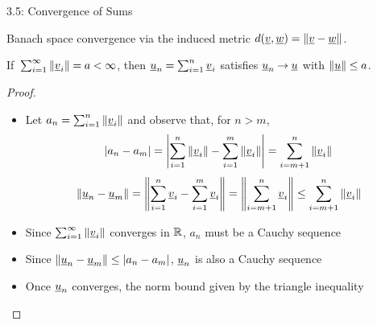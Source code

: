 \documentclass[10pt,english,aspectratio=169]{beamer}
\begin{document}
\begin{frame}{3.5: Convergence of Sums}


Banach space convergence via the induced metric $d(\underline{v}, \underline{w}) = \| \underline{v}-\underline{w} \|$.

\newcommand{\vtp}{\hspace{-0.02em}}
\begin{lemma}
If $\,\sum_{i=1}^\infty \| \vecnot{v}_i \| \vtp = \vtp a \vtp <\vtp \infty$, then $\vecnot{u}_n \vtp = \vtp \sum_{i=1}^n \vecnot{v}_i$ satisfies $\vecnot{u}_n \vtp \to \vtp \vecnot{u}$ with $\| \vecnot{u} \| \vtp \leq \vtp a$.
\end{lemma}
\vspace{-0.5mm}

\begin{proof}
\begin{itemize}
\item Let $a_n = \sum_{i=1}^n \| \underline{v}_i \|$ and observe that, for $n\!>\!m$, \vspace{-2mm}
\[ |a_n - a_m| = \left| \sum_{i=1}^n \| \underline{v}_i \| - \sum_{i=1}^m \| \underline{v}_i \|  \right| = \sum_{i=m+1}^n \| \underline{v}_i \| \] 
\vspace{-2mm}
\[ \|\underline{u}_n - \underline{u}_m \| = \left\| \sum_{i=1}^n \underline{v}_i - \sum_{i=1}^m \underline{v}_i  \right\| = \left\| \sum_{i=m+1}^n \underline{v}_i \right\| \leq \sum_{i=m+1}^n \| \underline{v}_i \| \] 

\item Since $\sum_{i=1}^\infty \| \underline{v}_i \|$ converges in $\mathbb{R}$, $a_n$ must be a Cauchy sequence \vspace{1mm}

\item Since $\|\underline{u}_n - \underline{u}_m\| \leq |a_n - a_m|$, $\underline{u}_n$ is also a Cauchy sequence \vspace{1mm}

\item Once $\underline{u}_n$ converges, the norm bound given by the triangle inequality \hfill \qedhere

\end{itemize}

\end{proof}

\end{frame}
\end{document}
